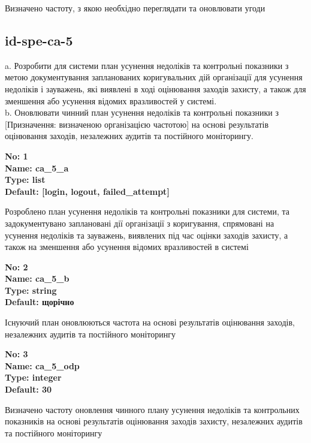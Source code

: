 \documentclass{article}
\begin{document}
{\footnotesize Визначено частоту, з якою необхідно переглядати та оновлювати угоди}




\subsection{id-spe-ca-5}
a. Розробити для системи план усунення недоліків та контрольні показники з метою документування запланованих коригувальних дій організації для усунення недоліків і зауважень, які виявлені в ході оцінювання заходів захисту, а також для зменшення або усунення відомих вразливостей у системі.\\ 
b. Оновлювати чинний план усунення недоліків та контрольні показники з [Призначення: визначеною організацією частотою] на основі результатів оцінювання заходів, незалежних аудитів та постійного моніторингу.

\vspace{10pt}
{\footnotesize\bfseries
No: 1\\
Name: ca\_\allowbreak{}5\_\allowbreak{}a\\
Type: list\\
Default: [\textquotedbl{}login\textquotedbl{}, \textquotedbl{}logout\textquotedbl{}, \textquotedbl{}failed\_\allowbreak{}attempt\textquotedbl{}]
}

{\footnotesize Розроблено план усунення недоліків та контрольні показники для системи, та задокументувано заплановані дії організації з коригування, спрямовані на усунення недоліків та зауважень, виявлених під час оцінки заходів захисту, а також на зменшення або усунення відомих вразливостей в системі}


{\footnotesize\bfseries
No: 2\\
Name: ca\_\allowbreak{}5\_\allowbreak{}b\\
Type: string\\
Default: \textquotedbl{}щорічно\textquotedbl{}
}

{\footnotesize Існуючий план оновлюються частота на основі результатів оцінювання заходів, незалежних аудитів та постійного моніторингу}


{\footnotesize\bfseries
No: 3\\
Name: ca\_\allowbreak{}5\_\allowbreak{}odp\\
Type: integer\\
Default: 30
}

{\footnotesize Визначено частоту оновлення чинного плану усунення недоліків та контрольних показників на основі результатів оцінювання заходів захисту, незалежних аудитів та постійного моніторингу}
\end{document}
